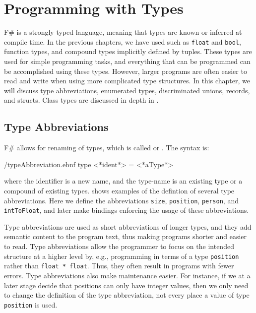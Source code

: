 \documentclass[fsharpnotes.tex]{subfiles}
\begin{document}
\chapter{Programming with Types}
\label{chap:type}
F\# is a strongly typed language, meaning that types are known or inferred at compile time. In the previous chapters, we have used  such as \lstinline{float} and \lstinline{bool},  function types, and compound types implicitly defined by tuples. These types are used for simple programming tasks, and everything that can be programmed can be accomplished using these types. However, larger programs are often easier to read and write when using more complicated type structures. In this chapter, we will discuss type abbreviations, enumerated types, discriminated unions, records, and structs. Class types are discussed in depth in .

\section{Type Abbreviations}
\label{sec:typeAbbreviations}
F\# allows for renaming of types, which is called  or . The syntax is:
%
\begin{verbatimwrite}{\ebnf/typeAbbreviation.ebnf}
type <*ident*> = <*aType*>
\end{verbatimwrite}
%
where the identifier is a new name, and the type-name is an existing type or a compound of existing types.  shows examples of the defintion of several type abbreviations.
%
%
Here we define the abbreviations \lstinline{size}, \lstinline{position}, \lstinline{person}, and \lstinline{intToFloat}, and later make bindings enforcing the usage of these abbreviations.

Type abbreviations are used as short abbreviations of longer types, and they add semantic content to the program text, thus making programs shorter and easier to read. Type abbreviations allow the programmer to focus on the intended structure at a higher level by, e.g., programming in terms of a type \lstinline{position} rather than \lstinline{float * float}. Thus, they often result in programs with fewer errors. Type abbreviations also make maintenance easier. For instance, if we at a later stage decide that positions can only have integer values, then we only need to change the definition of the type abbreviation, not every place a value of type \lstinline{position} is used.
\end{document}
